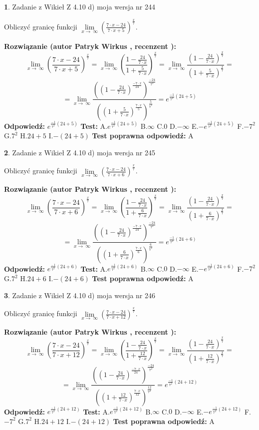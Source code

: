 \documentclass[12pt, a4paper]{article}
\theoremstyle{definition} %
\newtheorem{zad}{}
\newcommand{\zadStart}[1]{\begin{zad}#1\newline}
\newcommand{\zadStop}{\end{zad}}
\newcommand{\rozwStart}[2]{\noindent \textbf{Rozwiązanie (autor #1 , recenzent #2): }\newline}
\newcommand{\rozwStop}{\newline}
\newcommand{\odpStart}{\noindent \textbf{Odpowiedź:}\newline}
\newcommand{\odpStop}{\newline}
\newcommand{\testStart}{\noindent \textbf{Test:}\newline}
\newcommand{\testStop}{\newline}
\newcommand{\kluczStart}{\noindent \textbf{Test poprawna odpowiedź:}\newline}
\newcommand{\kluczStop}{\newline}
\begin{document}
\zadStart{Zadanie z Wikieł Z 4.10 d) moja wersja nr 244}


Obliczyć granicę funkcji  $\lim\limits_{x\to\ \infty}(\frac{7\cdot x-24}{7\cdot x+5})^{\frac{x}{7}}$.
\zadStop
\rozwStart{Patryk Wirkus}{}
$$\lim\limits_{x\to\ \infty}(\frac{7\cdot x-24}{7\cdot x+5})^{\frac{x}{7}} = \lim\limits_{x\to\ \infty}(\frac{1-\frac{24}{7\cdot x}}{1+\frac{5}{7\cdot x}})^{\frac{x}{7}}=\lim\limits_{x\to\ \infty}\frac{(1-\frac{24}{7\cdot x})^{\frac{x}{7}}}{(1+\frac{5}{7\cdot x})^{\frac{x}{7}}}=$$
$$=\lim\limits_{x\to\ \infty}\frac{((1-\frac{24}{7\cdot x})^{\frac{-7\cdot x}{24}})^{\frac{-24}{7^{2}}}}{((1+\frac{5}{7\cdot x})^{\frac{7\cdot x}{5}})^{\frac{5}{7^{2}}}}=e^{\frac{-1}{7^{2}}(24+5)}$$
\rozwStop
\odpStart
$e^{\frac{-1}{7^{2}}(24+5)}$
\odpStop
\testStart
A.$e^{\frac{-1}{7^{2}}(24+5)}$ B.$\infty$ C.$0$ D.$-\infty$ E.$-e^{\frac{-1}{7^{2}}(24+5)}$
F.$-7^{2}$ G.$7^{2}$
H.$24+5$
I.$-(24+5)$
\testStop
\kluczStart
A
\kluczStop



\zadStart{Zadanie z Wikieł Z 4.10 d) moja wersja nr 245}


Obliczyć granicę funkcji  $\lim\limits_{x\to\ \infty}(\frac{7\cdot x-24}{7\cdot x+6})^{\frac{x}{7}}$.
\zadStop
\rozwStart{Patryk Wirkus}{}
$$\lim\limits_{x\to\ \infty}(\frac{7\cdot x-24}{7\cdot x+6})^{\frac{x}{7}} = \lim\limits_{x\to\ \infty}(\frac{1-\frac{24}{7\cdot x}}{1+\frac{6}{7\cdot x}})^{\frac{x}{7}}=\lim\limits_{x\to\ \infty}\frac{(1-\frac{24}{7\cdot x})^{\frac{x}{7}}}{(1+\frac{6}{7\cdot x})^{\frac{x}{7}}}=$$
$$=\lim\limits_{x\to\ \infty}\frac{((1-\frac{24}{7\cdot x})^{\frac{-7\cdot x}{24}})^{\frac{-24}{7^{2}}}}{((1+\frac{6}{7\cdot x})^{\frac{7\cdot x}{6}})^{\frac{6}{7^{2}}}}=e^{\frac{-1}{7^{2}}(24+6)}$$
\rozwStop
\odpStart
$e^{\frac{-1}{7^{2}}(24+6)}$
\odpStop
\testStart
A.$e^{\frac{-1}{7^{2}}(24+6)}$ B.$\infty$ C.$0$ D.$-\infty$ E.$-e^{\frac{-1}{7^{2}}(24+6)}$
F.$-7^{2}$ G.$7^{2}$
H.$24+6$
I.$-(24+6)$
\testStop
\kluczStart
A
\kluczStop



\zadStart{Zadanie z Wikieł Z 4.10 d) moja wersja nr 246}


Obliczyć granicę funkcji  $\lim\limits_{x\to\ \infty}(\frac{7\cdot x-24}{7\cdot x+12})^{\frac{x}{7}}$.
\zadStop
\rozwStart{Patryk Wirkus}{}
$$\lim\limits_{x\to\ \infty}(\frac{7\cdot x-24}{7\cdot x+12})^{\frac{x}{7}} = \lim\limits_{x\to\ \infty}(\frac{1-\frac{24}{7\cdot x}}{1+\frac{12}{7\cdot x}})^{\frac{x}{7}}=\lim\limits_{x\to\ \infty}\frac{(1-\frac{24}{7\cdot x})^{\frac{x}{7}}}{(1+\frac{12}{7\cdot x})^{\frac{x}{7}}}=$$
$$=\lim\limits_{x\to\ \infty}\frac{((1-\frac{24}{7\cdot x})^{\frac{-7\cdot x}{24}})^{\frac{-24}{7^{2}}}}{((1+\frac{12}{7\cdot x})^{\frac{7\cdot x}{12}})^{\frac{12}{7^{2}}}}=e^{\frac{-1}{7^{2}}(24+12)}$$
\rozwStop
\odpStart
$e^{\frac{-1}{7^{2}}(24+12)}$
\odpStop
\testStart
A.$e^{\frac{-1}{7^{2}}(24+12)}$ B.$\infty$ C.$0$ D.$-\infty$ E.$-e^{\frac{-1}{7^{2}}(24+12)}$
F.$-7^{2}$ G.$7^{2}$
H.$24+12$
I.$-(24+12)$
\testStop
\kluczStart
A
\kluczStop
\end{document}
